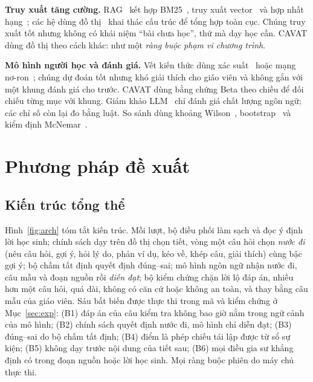 \documentclass[10pt,a4paper,twocolumn]{article}
\begin{document}
\textbf{Truy xuất tăng cường.} RAG~\cite{lewis2020} kết hợp BM25~\cite{robertson2009}, truy xuất vector~\cite{karpukhin2020} và hợp nhất hạng~\cite{cormack2009}; các hệ dùng đồ thị~\cite{edge2024} khai thác cấu trúc để tổng hợp toàn cục. Chúng truy xuất tốt nhưng không có khái niệm ``bài chưa học'', thứ mà dạy học cần. CAVAT dùng đồ thị theo cách khác: như một \emph{ràng buộc phạm vi chương trình}.

\textbf{Mô hình người học và đánh giá.} Vết kiến thức dùng xác suất~\cite{corbett1995,pelanek2017} hoặc mạng nơ-ron~\cite{piech2015}; chúng dự đoán tốt nhưng khó giải thích cho giáo viên và không gắn với một khung đánh giá cho trước. CAVAT dùng bằng chứng Beta theo chiều để đối chiếu từng mục với khung. Giám khảo LLM~\cite{zheng2023} chỉ đánh giá chất lượng ngôn ngữ; các chỉ số còn lại đo bằng luật. So sánh dùng khoảng Wilson~\cite{wilson1927}, bootstrap~\cite{efron1993} và kiểm định McNemar~\cite{mcnemar1947}.

\section{Phương pháp đề xuất}\label{sec:method}
\subsection{Kiến trúc tổng thể}
Hình~\ref{fig:arch} tóm tắt kiến trúc. Mỗi lượt, bộ điều phối làm sạch và đọc ý định lời học sinh; chính sách dạy trên đồ thị chọn tiết, vòng một câu hỏi chọn \emph{nước đi} (nêu câu hỏi, gợi ý, hỏi lý do, phản ví dụ, kéo về, khép câu, giải thích) cùng bậc gợi ý; bộ chấm tất định quyết định đúng--sai; mô hình ngôn ngữ nhận nước đi, câu mẫu và đoạn nguồn rồi \emph{diễn đạt}; bộ kiểm chứng chặn lời lộ đáp án, nhiều hơn một câu hỏi, quá dài, không có căn cứ hoặc không an toàn, và thay bằng câu mẫu của giáo viên. Sáu bất biến được thực thi trong mã và kiểm chứng ở Mục~\ref{sec:exp}: (B1) đáp án của câu kiểm tra không bao giờ nằm trong ngữ cảnh của mô hình; (B2) chính sách quyết định nước đi, mô hình chỉ diễn đạt; (B3) đúng--sai do bộ chấm tất định; (B4) điểm là phép chiếu tái lập được từ sổ sự kiện; (B5) không dạy trước nội dung của tiết sau; (B6) mọi điều gia sư khẳng định có trong đoạn nguồn hoặc lời học sinh. Mọi ràng buộc phiên do máy chủ thực thi.
\end{document}
